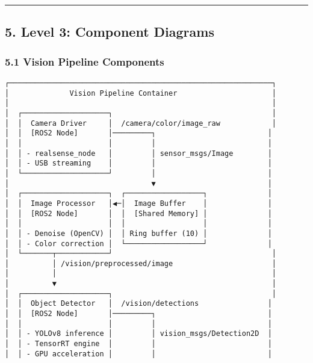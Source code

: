 \documentclass[
]{article}
\begin{document}
\begin{center}\rule{0.5\linewidth}{0.5pt}\end{center}

\hypertarget{level-3-component-diagrams}{%
\subsection{5. Level 3: Component
Diagrams}\label{level-3-component-diagrams}}

\hypertarget{vision-pipeline-components}{%
\subsubsection{5.1 Vision Pipeline
Components}\label{vision-pipeline-components}}

\begin{verbatim}
┌─────────────────────────────────────────────────────────────┐
│              Vision Pipeline Container                      │
│                                                             │
│  ┌────────────────────┐                                     │
│  │  Camera Driver     │  /camera/color/image_raw            │
│  │  [ROS2 Node]       │─────────┐                          │
│  │                    │         │                          │
│  │ - realsense_node   │         │ sensor_msgs/Image        │
│  │ - USB streaming    │         │                          │
│  └────────────────────┘         │                          │
│                                 ▼                          │
│  ┌────────────────────┐  ┌──────────────────┐              │
│  │  Image Processor   │◀─│  Image Buffer    │              │
│  │  [ROS2 Node]       │  │  [Shared Memory] │              │
│  │                    │  │                  │              │
│  │ - Denoise (OpenCV) │  │ Ring buffer (10) │              │
│  │ - Color correction │  └──────────────────┘              │
│  └───────┬────────────┘                                     │
│          │ /vision/preprocessed/image                       │
│          │                                                  │
│          ▼                                                  │
│  ┌────────────────────┐                                     │
│  │  Object Detector   │  /vision/detections                │
│  │  [ROS2 Node]       │─────────┐                          │
│  │                    │         │                          │
│  │ - YOLOv8 inference │         │ vision_msgs/Detection2D  │
│  │ - TensorRT engine  │         │                          │
│  │ - GPU acceleration │         │                          │

\end{verbatim}
\end{document}
